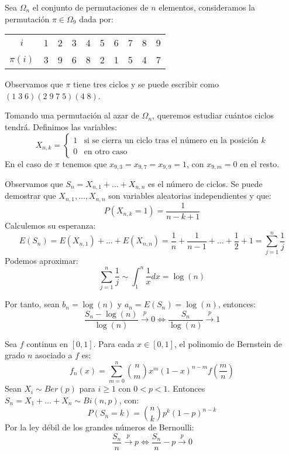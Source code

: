 \begin{example}
    Sea $\Omega_n$ el conjunto de permutaciones de $n$ elementos, consideramos la permutación $\pi \in \Omega_9$ dada por:
    \begin{center}
        \begin{tabular}{ c | c c c c c c c c c}
            $i$      & 1 & 2 & 3 & 4 & 5 & 6 & 7 & 8 & 9 \\
            $\pi(i)$ & 3 & 9 & 6 & 8 & 2 & 1 & 5 & 4 & 7
        \end{tabular}
    \end{center}
    Observamos que $\pi$ tiene tres ciclos y se puede escribir como $(1 \; 3 \; 6)(2 \; 9 \; 7 \; 5)(4 \; 8)$.

    Tomando una permutación al azar de $\Omega_n$, queremos estudiar cuántos ciclos tendrá.
    Definimos las variables:
    $$X_{n, k} = \begin{cases}
            1 & \text{si se cierra un ciclo tras el número en la posición } k \\
            0 & \text{en otro caso}
        \end{cases}$$
    En el caso de $\pi$ tenemos que $x_{9, 3} = x_{9, 7} = x_{9, 9} = 1$, con $x_{9, m} = 0$ en el resto.

    Observamos que $S_n = X_{n, 1} + \dots + X_{n, n}$ es el número de ciclos.
    Se puede demostrar que $X_{n, 1}, \dots, X_{n, n}$ son variables aleatorias independientes y que:
    $$P(X_{n, k} = 1) = \frac{1}{n-k+1}$$
    Calculemos su esperanza:
    $$E(S_n) = E(X_{n, 1}) + \dots + E(X_{n, n}) = \frac{1}{n} + \frac{1}{n-1} + \dots + \frac{1}{2} + 1 = \sum_{j=1}^n \frac{1}{j}$$
    Podemos aproximar:
    $$\sum_{j=1}^n \frac{1}{j} \sim \int_1^n \frac{1}{x}dx = \log(n)$$

    Por tanto, sean $b_n = \log(n)$ y $a_n = E(S_n) = \log(n)$, entonces:
    $$\frac{S_n - \log(n)}{\log(n)} \xrightarrow{p} 0 \Leftrightarrow \frac{S_n}{\log(n)} \xrightarrow{p} 1$$
\end{example}

\begin{example}
    Sea $f$ continua en $[0, 1]$.
    Para cada $x \in [0, 1]$, el polinomio de Bernstein de grado $n$ asociado a $f$ es:
    $$f_n(x) = \sum_{m=0}^n \binom{n}{m}x^m(1-x)^{n-m}f\left(\frac{m}{n}\right)$$
    Sean $X_i \sim Ber(p)$ para $i \geq 1$ con $0 < p < 1$.
    Entonces $S_n = X_1 + \dots + X_n \sim Bi(n, p)$, con:
    $$P(S_n = k) = \binom{n}{k}p^k(1-p)^{n-k}$$
    Por la ley débil de los grandes números de Bernoulli:
    $$\frac{S_n}{n} \xrightarrow{p} p \Leftrightarrow \frac{S_n}{n} - p \xrightarrow{p} 0$$
\end{example}
